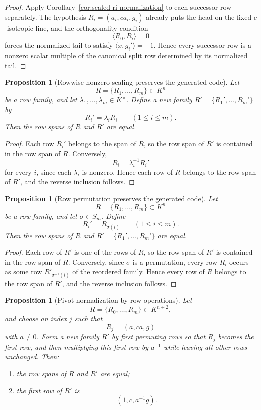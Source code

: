 \documentclass[12pt]{article}
\newtheorem{prop}[theorem]{Proposition}
\begin{document}
\begin{proof}
Apply Corollary~\ref{cor:scaled-ri-normalization} to each successor row separately. The hypothesis $R_i=(a_i,c a_i,g_i)$ already puts the head on the fixed $c$-isotropic line, and the orthogonality condition
\[
\langle R_0,R_i\rangle=0
\]
forces the normalized tail to satisfy $\langle x,g_i'\rangle=-1$. Hence every successor row is a nonzero scalar multiple of the canonical split row determined by its normalized tail.
\end{proof}

\begin{prop}[Rowwise nonzero scaling preserves the generated code]
\label{prop:row-scaling-same-code}
Let
\[
R=\{R_1,\dots,R_m\}\subset K^n
\]
be a row family, and let $\lambda_1,\dots,\lambda_m\in K^\times$. Define a new family $R'=\{R_1',\dots,R_m'\}$ by
\[
R_i'=\lambda_i R_i \qquad (1\le i\le m).
\]
Then the row spans of $R$ and $R'$ are equal.
\end{prop}

\begin{proof}
Each row $R_i'$ belongs to the span of $R$, so the row span of $R'$ is contained in the row span of $R$. Conversely,
\[
R_i=\lambda_i^{-1}R_i'
\]
for every $i$, since each $\lambda_i$ is nonzero. Hence each row of $R$ belongs to the row span of $R'$, and the reverse inclusion follows.
\end{proof}

\begin{prop}[Row permutation preserves the generated code]
\label{prop:row-permutation-same-code}
Let
\[
R=\{R_1,\dots,R_m\}\subset K^n
\]
be a row family, and let $\sigma\in S_m$. Define
\[
R_i' = R_{\sigma(i)} \qquad (1\le i\le m).
\]
Then the row spans of $R$ and $R'=\{R_1',\dots,R_m'\}$ are equal.
\end{prop}

\begin{proof}
Each row of $R'$ is one of the rows of $R$, so the row span of $R'$ is contained in the row span of $R$. Conversely, since $\sigma$ is a permutation, every row $R_i$ occurs as some row $R'_{\sigma^{-1}(i)}$ of the reordered family. Hence every row of $R$ belongs to the row span of $R'$, and the reverse inclusion follows.
\end{proof}

\begin{prop}[Pivot normalization by row operations]
\label{prop:pivot-normalization-row-ops}
Let
\[
R=\{R_0,\dots,R_m\}\subset K^{n+2},
\]
and choose an index $j$ such that
\[
R_j=(a,c a,g)
\]
with $a\neq 0$. Form a new family $R'$ by first permuting rows so that $R_j$ becomes the first row, and then multiplying this first row by $a^{-1}$ while leaving all other rows unchanged. Then:
\begin{enumerate}
\item the row spans of $R$ and $R'$ are equal;
\item the first row of $R'$ is
\[
(1,c,a^{-1}g).
\]
\end{enumerate}
\end{prop}
\end{document}
